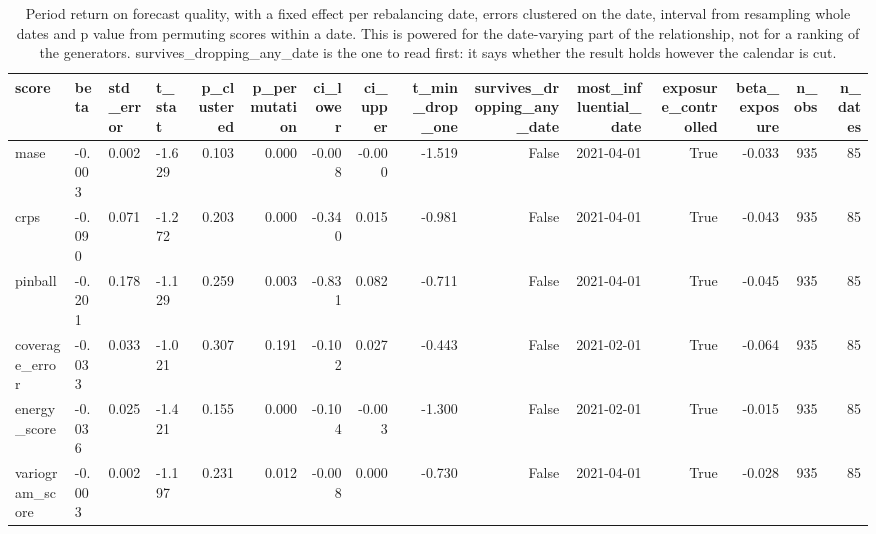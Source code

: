 \begin{table}
\caption{Period return on forecast quality, with a fixed effect per rebalancing date, errors clustered on the date, interval from resampling whole dates and p value from permuting scores within a date. This is powered for the date-varying part of the relationship, not for a ranking of the generators. survives_dropping_any_date is the one to read first: it says whether the result holds however the calendar is cut.}
\label{tab:transmission_panel}
\begin{tabular}{llllrrrrrrrrrrr}
\toprule
score & beta & std\_error & t\_stat & p\_clustered & p\_permutation & ci\_lower & ci\_upper & t\_min\_drop\_one & survives\_dropping\_any\_date & most\_influential\_date & exposure\_controlled & beta\_exposure & n\_obs & n\_dates \\
\midrule
mase & -0.003 & 0.002 & -1.629 & 0.103 & 0.000 & -0.008 & -0.000 & -1.519 & False & 2021-04-01 & True & -0.033 & 935 & 85 \\
crps & -0.090 & 0.071 & -1.272 & 0.203 & 0.000 & -0.340 & 0.015 & -0.981 & False & 2021-04-01 & True & -0.043 & 935 & 85 \\
pinball & -0.201 & 0.178 & -1.129 & 0.259 & 0.003 & -0.831 & 0.082 & -0.711 & False & 2021-04-01 & True & -0.045 & 935 & 85 \\
coverage\_error & -0.033 & 0.033 & -1.021 & 0.307 & 0.191 & -0.102 & 0.027 & -0.443 & False & 2021-02-01 & True & -0.064 & 935 & 85 \\
energy\_score & -0.036 & 0.025 & -1.421 & 0.155 & 0.000 & -0.104 & -0.003 & -1.300 & False & 2021-02-01 & True & -0.015 & 935 & 85 \\
variogram\_score & -0.003 & 0.002 & -1.197 & 0.231 & 0.012 & -0.008 & 0.000 & -0.730 & False & 2021-04-01 & True & -0.028 & 935 & 85 \\
\bottomrule
\end{tabular}
\end{table}
